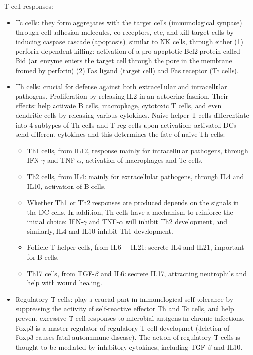 \documentclass{report}
\begin{document}
T cell responses: 
\begin{itemize} 
\item Tc cells: they form aggregates with the target cells (immunological synpase) through cell adhesion molecules, co-receptors, etc, and kill target cells by inducing caspase cascade (apoptosis), similar to NK cells, through either (1) perforin-dependent killing: activation of a pro-apoptotic Bcl2 protein called Bid (an enzyme enters the target cell through the pore in the membrane fromed by perforin) (2) Fas ligand (target cell) and Fas receptor (Tc cells).

\item Th cells: crucial for defense against both extracellular and intracellular pathogens. Proliferation by releasing IL2 in an autocrine fashion. Their effects: help activate B cells, macrophage, cytotoxic T cells, and even dendritic cells by releasing various cytokines. Naive helper T cells differentiate into 4 subtypes of Th cells and T-reg cells upon activation: activated DCs send different cytokines and this determines the fate of naive Th cells: 
\begin{itemize}
	\item Th1 cells, from IL12, response mainly for intracellular pathogens, through IFN-$\gamma$ and TNF-$\alpha$, activation of macrophages and Tc cells. 
	
	\item Th2 cells, from IL4: mainly for extracellular pathogens, through IL4 and IL10, activation of B cells.
	 
	\item Whether Th1 or Th2 responses are produced depends on the signals in the DC cells. In addition, Th cells have a mechanism to reinforce the initial choice: IFN-$\gamma$ and TNF-$\alpha$ will inhibit Th2 development, and similarly, IL4 and IL10 inhibit Th1 development.
	
	\item Follicle T helper cells, from IL6 + IL21: secrete IL4 and IL21, important for B cells.
	
	\item Th17 cells, from TGF-$\beta$ and IL6: secrete IL17, attracting neutrophils and help with wound healing.
\end{itemize}

\item Regulatory T cells: play a crucial part in immunological self tolerance by suppressing the activity of self-reactive effector Th and Tc cells, and help prevent excessive T cell responses to microbial antigens in chronic infections. Foxp3 is a master regulator of regulatory T cell developmet (deletion of Foxp3 causes fatal autoimmune disease). The action of regulatory T cells is thought to be mediated by inhibitory cytokines, including TGF-$\beta$ and IL10.


\end{itemize}
\end{document}
